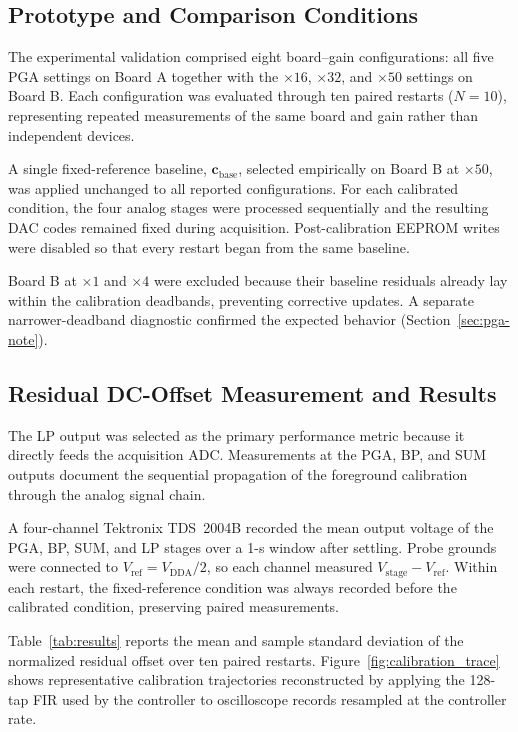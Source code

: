 \subsection{Prototype and Comparison Conditions}

The experimental validation comprised eight board--gain configurations: all five PGA settings on Board A together with the $\times16$, $\times32$, and $\times50$ settings on Board B. Each configuration was evaluated through ten paired restarts ($N=10$), representing repeated measurements of the same board and gain rather than independent devices.

A single fixed-reference baseline, $\mathbf{c}_{\mathrm{base}}$, selected empirically on Board B at $\times50$, was applied unchanged to all reported configurations. For each calibrated condition, the four analog stages were processed sequentially and the resulting DAC codes remained fixed during acquisition. Post-calibration EEPROM writes were disabled so that every restart began from the same baseline.

Board B at $\times1$ and $\times4$ were excluded because their baseline residuals already lay within the calibration deadbands, preventing corrective updates. A separate narrower-deadband diagnostic confirmed the expected behavior (Section~\ref{sec:pga-note}).

\subsection{Residual DC-Offset Measurement and Results}

The LP output was selected as the primary performance metric because it directly feeds the acquisition ADC. Measurements at the PGA, BP, and SUM outputs document the sequential propagation of the foreground calibration through the analog signal chain.

A four-channel Tektronix TDS~2004B recorded the mean output voltage of the PGA, BP, SUM, and LP stages over a 1-s window after settling. Probe grounds were connected to $V_{\mathrm{ref}}=V_{\mathrm{DDA}}/2$, so each channel measured $V_{\mathrm{stage}}-V_{\mathrm{ref}}$. Within each restart, the fixed-reference condition was always recorded before the calibrated condition, preserving paired measurements.

Table~\ref{tab:results} reports the mean and sample standard deviation of the normalized residual offset over ten paired restarts. Figure~\ref{fig:calibration_trace} shows representative calibration trajectories reconstructed by applying the 128-tap FIR used by the controller to oscilloscope records resampled at the controller rate.

